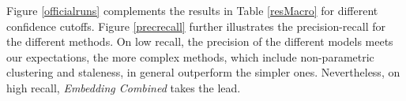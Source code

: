 \documentclass{sig-alternate}
\begin{document}
{{Figure \ref{officialruns} complements the results in Table \ref{resMacro} for different confidence cutoffs. %
Figure \ref{precrecall} further illustrates the precision-recall for the different methods. On low recall, the precision of the different models meets our expectations, the more complex methods, which include non-parametric clustering and staleness, in general outperform the simpler ones. Nevertheless, on high recall, {\textit{Embedding Combined}} takes the lead.



}}
\end{document}
